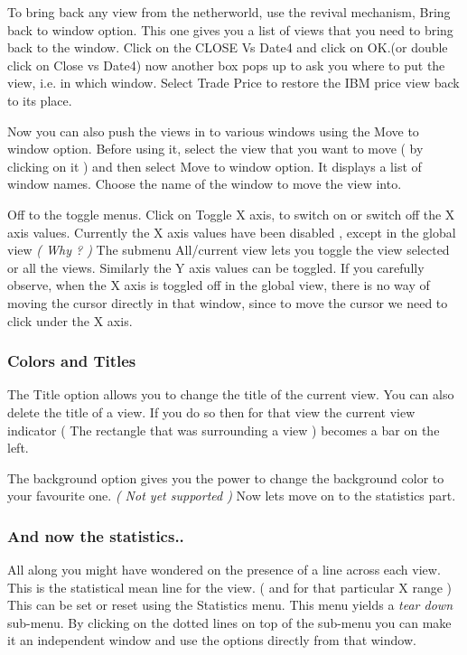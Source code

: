 	To bring back any view from the netherworld, use the revival mechanism, Bring back to window option. This one gives you a list of views that you need to bring back to the window. Click on the CLOSE Vs Date4 and click on OK.(or double click on Close vs Date4) now another box pops up to ask you where to put the view, i.e. in which window. Select Trade Price to restore the IBM price view back to its place. 

	
	Now you can also push the views in to various windows using the Move to window option. Before using it, select the view that you want to move ( by clicking on it ) and then select Move to window option. It displays a list of window names. Choose the name of the window to move the view into.


	Off to the toggle menus. Click on Toggle X axis, to switch on or switch off the X axis values. Currently the X axis values have been disabled , except in the global view {\em ( Why ? ) } The submenu All/current view lets you toggle the view selected or all the views. Similarly the Y axis values can be toggled. If you carefully observe, when the X axis is toggled off in the global view, there is no way of moving the cursor directly in that window, since to move the cursor we need to click under the X axis. 

\subsubsection{Colors and Titles}


	The Title option allows you to change the title of the current view. You can also  delete the title of a view. If you do so then for that view the current view indicator ( The rectangle that was surrounding a view ) becomes a bar on the left.


	The background option gives you the power to change the background color to your favourite one. {\em ( Not yet supported ) } Now lets move on to the statistics part.


\subsubsection{And now the statistics..}


	All along you might have wondered on the presence of a line across each view. This is the statistical mean line for the view. ( and for that particular X range ) This can be set or reset using the Statistics menu. This menu yields a {\em tear down } sub-menu. By clicking on the dotted lines on top of the sub-menu you can make it an independent window and use the options directly from that window.

